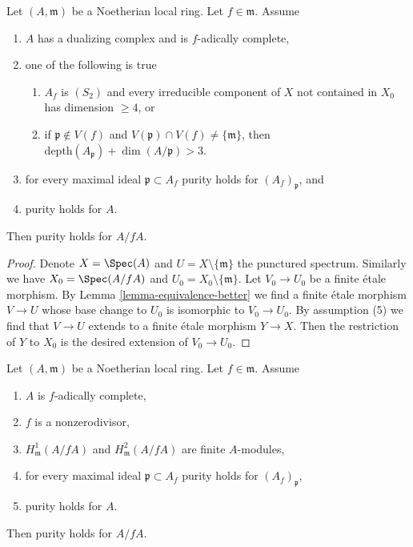 \begin{lemma}
\label{lemma-purity-inherited-by-hypersurface-better}
Let $(A, \mathfrak m)$ be a Noetherian local ring.
Let $f \in \mathfrak m$. Assume
\begin{enumerate}
\item $A$ has a dualizing complex and is $f$-adically complete,
\item one of the following is true
\begin{enumerate}
\item $A_f$ is $(S_2)$ and every irreducible component of $X$
not contained in $X_0$ has dimension $\geq 4$, or
\item if $\mathfrak p \not \in V(f)$ and
$V(\mathfrak p) \cap V(f) \not = \{\mathfrak m\}$, then
$\text{depth}(A_\mathfrak p) + \dim(A/\mathfrak p) > 3$.
\end{enumerate}
\item for every maximal ideal $\mathfrak p \subset A_f$
purity holds for $(A_f)_\mathfrak p$, and
\item purity holds for $A$.
\end{enumerate}
Then purity holds for $A/fA$.
\end{lemma}

\begin{proof}
Denote $X = \Spec(A)$ and $U = X \setminus \{\mathfrak m\}$
the punctured spectrum. Similarly we have $X_0 = \Spec(A/fA)$
and $U_0 = X_0 \setminus \{\mathfrak m\}$.
Let $V_0 \to U_0$ be a finite \'etale morphism. By
Lemma \ref{lemma-equivalence-better}
we find a finite \'etale morphism $V \to U$
whose base change to $U_0$
is isomorphic to $V_0 \to U_0$.
By assumption (5) we find that $V \to U$ extends
to a finite \'etale morphism $Y \to X$. Then the restriction of
$Y$ to $X_0$ is the desired extension of $V_0 \to U_0$.
\end{proof}

\begin{lemma}
\label{lemma-purity-inherited-by-hypersurface}
Let $(A, \mathfrak m)$ be a Noetherian local ring.
Let $f \in \mathfrak m$. Assume
\begin{enumerate}
\item $A$ is $f$-adically complete,
\item $f$ is a nonzerodivisor,
\item $H^1_\mathfrak m(A/fA)$ and $H^2_\mathfrak m(A/fA)$ are finite
$A$-modules,
\item for every maximal ideal $\mathfrak p \subset A_f$
purity holds for $(A_f)_\mathfrak p$,
\item purity holds for $A$.
\end{enumerate}
Then purity holds for $A/fA$.
\end{lemma}

